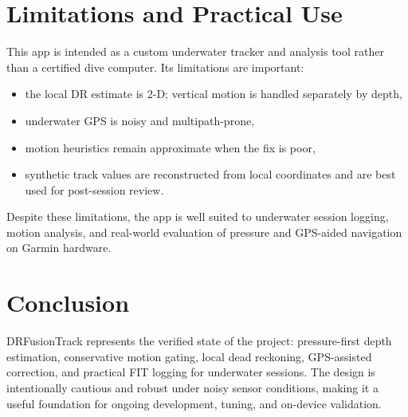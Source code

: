 \documentclass[conference]{IEEEtran}
\begin{document}
\section{Limitations and Practical Use}
This app is intended as a custom underwater tracker and analysis tool rather than a certified dive computer. Its limitations are important:

\begin{itemize}
\item the local DR estimate is 2-D; vertical motion is handled separately by depth,
\item underwater GPS is noisy and multipath-prone,
\item motion heuristics remain approximate when the fix is poor,
\item synthetic track values are reconstructed from local coordinates and are best used for post-session review.
\end{itemize}

Despite these limitations, the app is well suited to underwater session logging, motion analysis, and real-world evaluation of pressure and GPS-aided navigation on Garmin hardware.

\section{Conclusion}
DRFusionTrack represents the verified state of the project: pressure-first depth estimation, conservative motion gating, local dead reckoning, GPS-assisted correction, and practical FIT logging for underwater sessions. The design is intentionally cautious and robust under noisy sensor conditions, making it a useful foundation for ongoing development, tuning, and on-device validation.
\end{document}
